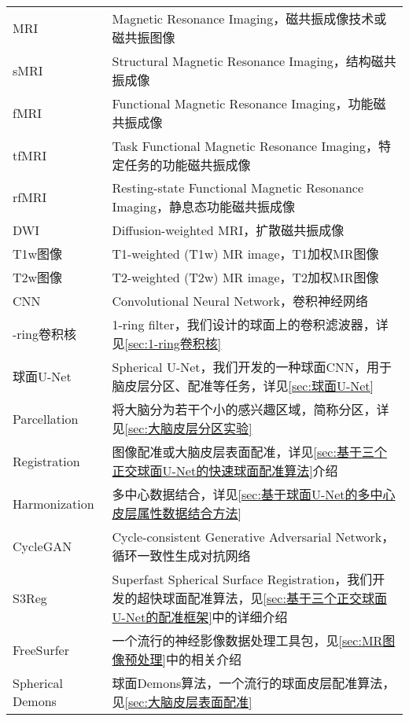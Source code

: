 \cleardoublepage
{}

\begin{center}
    \begin{longtable}{>{\raggedleft}p{}  p{}}
            MRI   & Magnetic Resonance Imaging，磁共振成像技术或磁共振图像\\
            sMRI & Structural Magnetic Resonance Imaging，结构磁共振成像 \\
            fMRI & Functional Magnetic Resonance Imaging，功能磁共振成像 \\
            tfMRI & Task Functional Magnetic Resonance Imaging，特定任务的功能磁共振成像 \\
            rfMRI & Resting-state Functional Magnetic Resonance Imaging，静息态功能磁共振成像 \\
            DWI  & Diffusion-weighted MRI，扩散磁共振成像 \\
            T1w图像  & T1-weighted (T1w) MR image，T1加权MR图像 \\
            T2w图像  & T2-weighted (T2w) MR image，T2加权MR图像  \\
            CNN     & Convolutional Neural Network，卷积神经网络 \\
            1-ring卷积核 & 1-ring filter，我们设计的球面上的卷积滤波器，详见\ref{sec:1-ring卷积核} \\
            球面U-Net & Spherical U-Net，我们开发的一种球面CNN，用于脑皮层分区、配准等任务，详见\ref{sec:球面U-Net} \\
            Parcellation & 将大脑分为若干个小的感兴趣区域，简称分区，详见\ref{sec:大脑皮层分区实验} \\
            Registration & 图像配准或大脑皮层表面配准，详见\ref{sec:基于三个正交球面U-Net的快速球面配准算法}介绍 \\
            Harmonization & 多中心数据结合，详见\ref{sec:基于球面U-Net的多中心皮层属性数据结合方法} \\
            CycleGAN & Cycle-consistent Generative Adversarial Network，循环一致性生成对抗网络 \\
            S3Reg & Superfast Spherical Surface Registration，我们开发的超快球面配准算法，见\ref{sec:基于三个正交球面U-Net的配准框架}中的详细介绍 \\
            FreeSurfer & 一个流行的神经影像数据处理工具包，见\ref{sec:MR图像预处理}中的相关介绍 \\
            Spherical Demons & 球面Demons算法，一个流行的球面皮层配准算法，见\ref{sec:大脑皮层表面配准}\\

\end{longtable}
\end{center}

